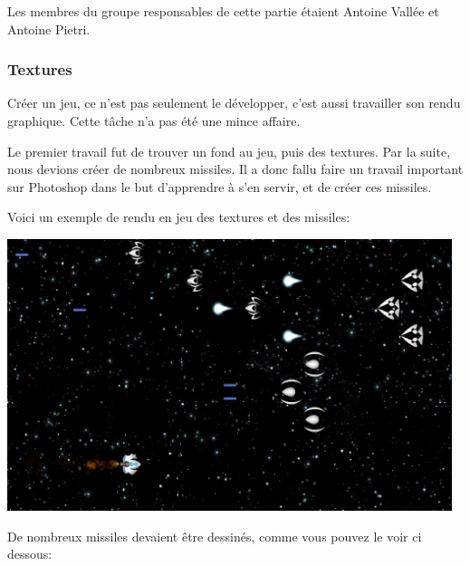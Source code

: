 \par Les membres du groupe responsables de cette partie étaient Antoine Vallée et Antoine Pietri.

\subsubsection{Textures}
\par Créer un jeu, ce n'est pas seulement le développer, c'est aussi travailler son rendu graphique. Cette tâche n'a pas été une mince affaire. 
\par Le premier travail fut de trouver un fond au jeu, puis des textures. Par la suite, nous devions créer de nombreux missiles. Il a donc fallu faire un travail important sur Photoshop dans le but d'apprendre à s'en servir, et de créer ces missiles.
\par Voici un exemple de rendu en jeu des textures et des missiles:

\begin{center}
	\includegraphics[width=13cm]{images/graphisme1.jpg}
\end{center}

\par De nombreux missiles devaient être dessinés, comme vous pouvez le voir ci dessous:


